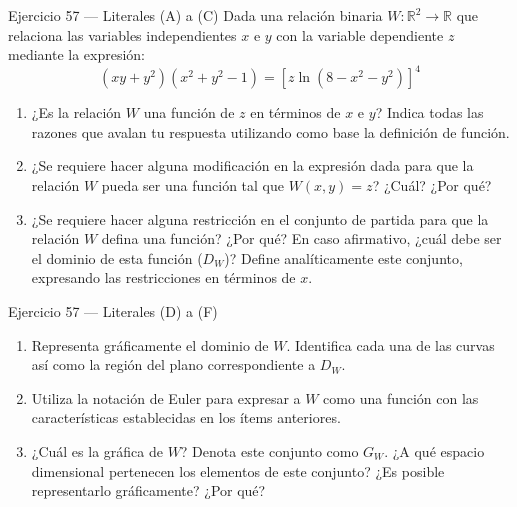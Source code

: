 \documentclass[aspectratio=169,10pt]{beamer}
\begin{document}
\begin{frame}{Ejercicio 57 — Literales (A) a (C)}
  \small
  Dada una relación binaria $W : \mathbb{R}^2 \longrightarrow \mathbb{R}$ que relaciona las variables independientes $x$ e $y$ con la variable dependiente $z$ mediante la expresión:
  \[
    (xy + y^2)(x^2 + y^2 - 1) = \left[z \ln(8 - x^2 - y^2)\right]^4
  \]
  \begin{enumerate}
    \item[(A)] ¿Es la relación $W$ una función de $z$ en términos de $x$ e $y$? Indica todas las razones que avalan tu respuesta utilizando como base la definición de función.
    \item[(B)] ¿Se requiere hacer alguna modificación en la expresión dada para que la relación $W$ pueda ser una función tal que $W(x,y) = z$? ¿Cuál? ¿Por qué?
    \item[(C)] ¿Se requiere hacer alguna restricción en el conjunto de partida para que la relación $W$ defina una función? ¿Por qué? En caso afirmativo, ¿cuál debe ser el dominio de esta función ($D_W$)? Define analíticamente este conjunto, expresando las restricciones en términos de $x$.
  \end{enumerate}
  \vfill
\end{frame}

\begin{frame}{Ejercicio 57 — Literales (D) a (F)}
  \small
  \begin{enumerate}
    \item[(D)] Representa gráficamente el dominio de $W$. Identifica cada una de las curvas así como la región del plano correspondiente a $D_W$.
    \item[(E)] Utiliza la notación de Euler para expresar a $W$ como una función con las características establecidas en los ítems anteriores.
    \item[(F)] ¿Cuál es la gráfica de $W$? Denota este conjunto como $G_W$. ¿A qué espacio dimensional pertenecen los elementos de este conjunto? ¿Es posible representarlo gráficamente? ¿Por qué?
  \end{enumerate}
  \vfill
\end{frame}
\end{document}
